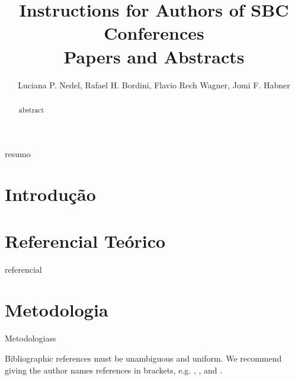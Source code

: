 \documentclass[12pt]{article}
\title{Instructions for Authors of SBC Conferences\\ Papers and Abstracts}
\author{Luciana P. Nedel\inst{1}, Rafael H. Bordini\inst{2}, Flavio Rech
  Wagner\inst{1}, Jomi F. Habner\inst{3} }
\begin{document}
 

\maketitle

\begin{abstract}
  abstract
\end{abstract}
     
\begin{resumo} 
  resumo
\end{resumo}


\section{Introdução}

\lipsum[1]

\section{Referencial Teórico}

  referencial

\section{Metodologia}

Metodologiass




Bibliographic references must be unambiguous and uniform.  We recommend giving
the author names references in brackets, e.g. \cite{knuth:84},
\cite{boulic:91}, and \cite{smith:99}.



\end{document}
